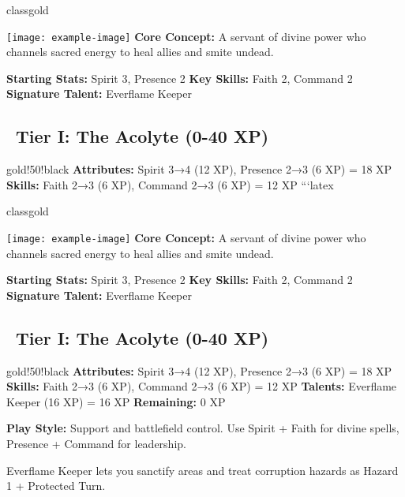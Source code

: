 \documentclass[11pt]{article}
\begin{document}
\newpage

\begin{classguide}{classgold}
\begin{multicols}{2}
\texttt{[image: example-image]}
\columnbreak
\textbf{Core Concept:} A servant of divine power who channels sacred energy to heal allies and smite undead.

\textbf{Starting Stats:} Spirit 3, Presence 2
\textbf{Key Skills:} Faith 2, Command 2
\textbf{Signature Talent:} Everflame Keeper
\end{multicols}

\subsection*{\faStar\ Tier I: The Acolyte (0-40 XP)}
\begin{tierbox}{gold!50!black}
\textbf{Attributes:} Spirit 3→4 (12 XP), Presence 2→3 (6 XP) = 18 XP
\textbf{Skills:} Faith 2→3 (6 XP), Command 2→3 (6 XP) = 12 XP
```latex
\begin{classguide}{classgold}
\begin{multicols}{2}
\texttt{[image: example-image]}
\columnbreak
\textbf{Core Concept:} A servant of divine power who channels sacred energy to heal allies and smite undead.

\textbf{Starting Stats:} Spirit 3, Presence 2
\textbf{Key Skills:} Faith 2, Command 2
\textbf{Signature Talent:} Everflame Keeper
\end{multicols}

\subsection*{\faStar\ Tier I: The Acolyte (0-40 XP)}
\begin{tierbox}{gold!50!black}
\textbf{Attributes:} Spirit 3→4 (12 XP), Presence 2→3 (6 XP) = 18 XP
\textbf{Skills:} Faith 2→3 (6 XP), Command 2→3 (6 XP) = 12 XP
\textbf{Talents:} Everflame Keeper (16 XP) = 16 XP
\textbf{Remaining:} 0 XP
\end{tierbox}

\textbf{Play Style:} Support and battlefield control. Use Spirit + Faith for divine spells, Presence + Command for leadership.

\begin{tipbox}
Everflame Keeper lets you sanctify areas and treat corruption hazards as Hazard 1 + Protected Turn.
\end{tipbox}


\end{classguide}
\end{tierbox}
\end{classguide}
\end{document}
